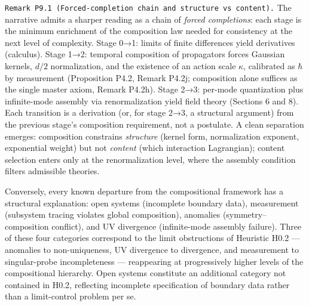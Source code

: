 \documentclass[
]{article}
\begin{document}
\texttt{Remark\ P9.1\ (Forced-completion\ chain\ and\ structure\ vs\ content).}
The narrative admits a sharper reading as a chain of \emph{forced
completions}: each stage is the minimum enrichment of the composition
law needed for consistency at the next level of complexity. Stage 0→1:
limits of finite differences yield derivatives (calculus). Stage 1→2:
temporal composition of propagators forces Gaussian kernels, \(d/2\)
normalization, and the existence of an action scale \(\kappa\),
calibrated as \(\hbar\) by measurement (Proposition P4.2, Remark P4.2j;
composition alone suffices as the single master axiom, Remark P4.2h).
Stage 2→3: per-mode quantization plus infinite-mode assembly via
renormalization yield field theory (Sections 6 and 8). Each transition
is a derivation (or, for stage 2→3, a structural argument) from the
previous stage's composition requirement, not a postulate. A clean
separation emerges: composition constrains \emph{structure} (kernel
form, normalization exponent, exponential weight) but not \emph{content}
(which interaction Lagrangian); content selection enters only at the
renormalization level, where the assembly condition filters admissible
theories.

Conversely, every known departure from the compositional framework has a
structural explanation: open systems (incomplete boundary data),
measurement (subsystem tracing violates global composition), anomalies
(symmetry--composition conflict), and UV divergence (infinite-mode
assembly failure). Three of these four categories correspond to the
limit obstructions of Heuristic H0.2 --- anomalies to non-uniqueness, UV
divergence to divergence, and measurement to singular-probe
incompleteness --- reappearing at progressively higher levels of the
compositional hierarchy. Open systems constitute an additional category
not contained in H0.2, reflecting incomplete specification of boundary
data rather than a limit-control problem per se.
\end{document}
